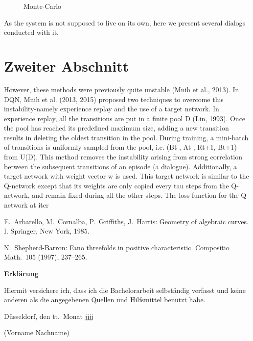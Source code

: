 \documentclass[12pt,titlepage,a4paper]{article}
\begin{document}
\begin{figure}[!htb]
      \caption{Monte-Carlo}
    \endminipage
\end{figure}

As the system is not supposed to live on its own, here we present several dialogs conducted with it. 
\section{Zweiter Abschnitt}

However, these methods were previously quite unstable (Mnih et al., 2013). In DQN,
Mnih et al. (2013, 2015) proposed two techniques
to overcome this instability-namely experience replay and the use of a target network. In experience replay, all the transitions are put in a finite
pool D (Lin, 1993). Once the pool has reached
its predefined maximum size, adding a new transition results in deleting the oldest transition in
the pool. During training, a mini-batch of transitions is uniformly sampled from the pool, i.e.
(Bt
, At
, Rt+1, Bt+1) from U(D). This method removes the instability arising from strong correlation between the subsequent transitions of an
episode (a dialogue). Additionally, a target network with weight vector w is used. This target
network is similar to the Q-network except that
its weights are only copied every tau steps from the
Q-network, and remain fixed during all the other
steps. The loss function for the Q-network at iter

\pagebreak
\begin{thebibliography}{ccccc}

E.\ Arbarello, M.\ Cornalba, P.\ Griffiths, J.\ Harris:
Geometry of algebraic curves. I. 
Springer, New York, 1985.

N.\ Shepherd-Barron:
Fano threefolds in positive characteristic.
Compositio Math.\  105  (1997),  237--265.

\end{thebibliography}



\pagebreak\noindent
\textbf{\LARGE Erkl\"arung}

\bigskip\bigskip
\noindent 
Hiermit versichere ich, dass ich die   Bachelorarbeit selbst\"andig verfasst und keine
anderen als die angegebenen Quellen und Hilfsmittel benutzt habe.

\bigskip
\noindent
D\"usseldorf, den tt.\ Monat jjjj

\bigskip\bigskip\bigskip
\noindent
(Vorname Nachname)
\end{document}
